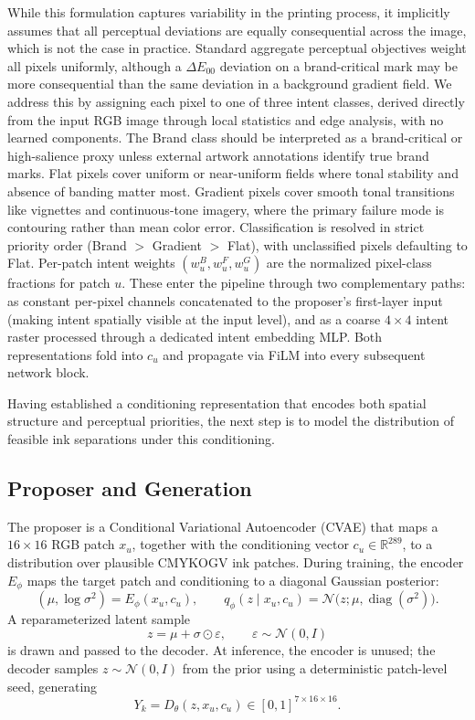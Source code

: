 \documentclass[acmsmall,screen,nonacm]{acmart}
\begin{document}
While this formulation captures variability in the printing process, it implicitly assumes that all perceptual deviations are equally consequential across the image, which is not the case in practice. Standard aggregate perceptual objectives weight all pixels uniformly, although a $\Delta E_{00}$ deviation on a brand-critical mark may be more consequential than the same deviation in a background gradient field. We address this by assigning each pixel to one of three intent classes, derived directly from the input RGB image through local statistics and edge analysis, with no learned components. The Brand class should be interpreted as a brand-critical or high-salience proxy unless external artwork annotations identify true brand marks. Flat pixels cover uniform or near-uniform fields where tonal stability and absence of banding matter most. Gradient pixels cover smooth tonal transitions like vignettes and continuous-tone imagery, where the primary failure mode is contouring rather than mean color error. Classification is resolved in strict priority order (Brand $>$ Gradient $>$ Flat), with unclassified pixels defaulting to Flat. Per-patch intent weights $(w_u^B, w_u^F, w_u^G)$ are the normalized pixel-class fractions for patch $u$. These enter the pipeline through two complementary paths: as constant per-pixel channels concatenated to the proposer's first-layer input (making intent spatially visible at the input level), and as a coarse $4\times 4$ intent raster processed through a dedicated intent embedding MLP. Both representations fold into $c_u$ and propagate via FiLM into every subsequent network block.

Having established a conditioning representation that encodes both spatial structure and perceptual priorities, the next step is to model the distribution of feasible ink separations under this conditioning.

\subsection{Proposer and Generation}

The proposer is a Conditional Variational Autoencoder (CVAE) \cite{kingma,sohn} that maps a $16\times 16$ RGB patch $x_u$, together with the conditioning vector $c_u \in \mathbb{R}^{289}$, to a distribution over plausible CMYKOGV ink patches. During training, the encoder $E_{\phi}$ maps the target patch and conditioning to a diagonal Gaussian posterior:
\[
(\mu, \log \sigma^2) = E_{\phi}(x_u, c_u), \qquad
q_{\phi}(z \mid x_u, c_u) = \mathcal{N}\!\bigl(z; \mu, \operatorname{diag}(\sigma^2)\bigr).
\]
A reparameterized latent sample
\[
z = \mu + \sigma \odot \varepsilon, \qquad \varepsilon \sim \mathcal{N}(0,I)
\]
is drawn and passed to the decoder. At inference, the encoder is unused; the decoder samples $z \sim \mathcal{N}(0,I)$ from the prior using a deterministic patch-level seed, generating
\[
Y_k = D_{\theta}(z, x_u, c_u) \in [0,1]^{7\times 16\times 16}.
\]
\end{document}
